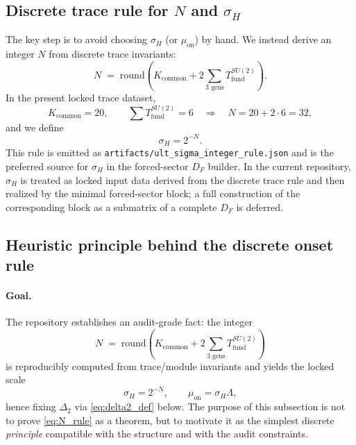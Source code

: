 \documentclass[11pt]{article}
\begin{document}
\subsection{Discrete trace rule for \texorpdfstring{$N$}{N} and \texorpdfstring{$\sigma_H$}{sigmaH}}
The key step is to avoid choosing $\sigma_H$ (or $\mu_{\mathrm{on}}$) by hand. We instead derive an integer $N$ from discrete trace invariants:
\begin{equation}
\boxed{N \;=\; \mathrm{round}\!\left(K_{\mathrm{common}} + 2\sum_{\text{3 gens}} T_{\mathrm{fund}}^{SU(2)}\right)}.
\end{equation}
In the present locked trace dataset,
\begin{equation}
K_{\mathrm{common}}=20,\qquad \sum T_{\mathrm{fund}}^{SU(2)}=6
\quad\Longrightarrow\quad
N = 20 + 2\cdot 6 = 32,
\end{equation}
and we define
\begin{equation}
\boxed{\sigma_H = 2^{-N}}.
\end{equation}
This rule is emitted as \texttt{artifacts/ult\_sigma\_integer\_rule.json} and is the preferred source for $\sigma_H$ in the forced-sector $D_F$ builder.
In the current repository, $\sigma_H$ is treated as locked input data derived from the discrete trace rule and then realized by the minimal forced-sector block; a full construction of the corresponding block as a submatrix of a complete $D_F$ is deferred.

\subsection{Heuristic principle behind the discrete onset rule}
\label{sec:heuristic_principle}

\paragraph{Goal.}
The repository establishes an audit-grade fact: the integer
\begin{equation}
N \;=\; \mathrm{round}\!\left(K_{\mathrm{common}} + 2\sum_{\text{3 gens}} T_{\mathrm{fund}}^{SU(2)}\right)
\label{eq:N_rule}
\end{equation}
is reproducibly computed from trace/module invariants and yields the locked scale
\begin{equation}
\sigma_H = 2^{-N},\qquad \mu_{\mathrm{on}}=\sigma_H\Lambda,
\label{eq:sigma_mu}
\end{equation}
hence fixing $\Delta_2$ via \eqref{eq:delta2_def} below. The purpose of this subsection is not to prove \eqref{eq:N_rule} as a theorem, but to motivate it as the simplest discrete \emph{principle} compatible with the structure and with the audit constraints.
\end{document}
